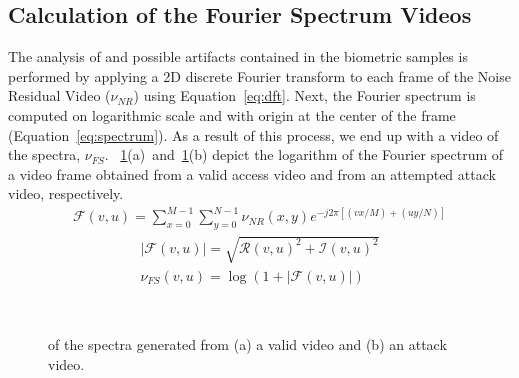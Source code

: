 \documentclass[journal]{IEEEtran}
\providecommand{\rv}[1]{{\protect\color{black}{#1}}}
\providecommand{\rrv}[1]{{\protect\color{black}{#1}}}
\begin{document}
\subsection{Calculation of the Fourier Spectrum Videos}
The analysis of \rv{the noise pattern} and possible artifacts contained in the biometric samples is performed by applying a 2D discrete Fourier transform to each frame of the Noise Residual Video ($\nu_{NR}$) using Equation~\ref{eq:dft}. Next, the Fourier spectrum is computed on logarithmic scale and with origin at the center of the frame (Equation~\ref{eq:spectrum}). As a result of this process, we end up with a video of the spectra, \rv{further on in this document referred to as Fourier Spectrum Videos} $\nu_{FS}$. \rrv{Fig.}~\ref{fig:spectrum}(a)~and~\ref{fig:spectrum}(b) depict the logarithm of the Fourier spectrum of a video frame obtained from a valid access video and from an attempted attack video, respectively.
%
\begin{eqnarray}
	\mathcal{F}{(v, u)} = \sum_{x=0}^{M-1}{\sum_{y=0}^{N-1}{\nu_{NR}(x,y)e^{-j2\pi[(vx/M) + (uy/N)]}}}
\label{eq:dft}
\end{eqnarray}
%
\begin{eqnarray}
	|\mathcal{F}{(v, u)}| = \sqrt{\mathcal{R}{(v, u)}^{2} + \mathcal{I}{(v, u)}^{2}} \nonumber\\
	\nu_{FS}{(v, u)} = \log(1 + |\mathcal{F}{(v, u)}|)
\label{eq:spectrum}
\end{eqnarray}
%
\begin{figure}[t]
\centering
{}\hspace{1mm}
\\
\caption{\rv{Example of a video frame} of the spectra generated from (a) a valid video and (b) an attack video.}
\label{fig:spectrum}
\end{figure}
\end{document}

